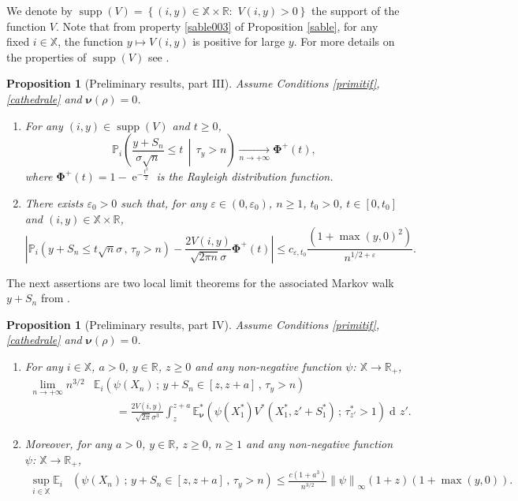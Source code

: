 \documentclass[12pt]{amsart}
\newtheorem{proposition}[theorem]{Proposition}
\theoremstyle{definition}
\numberwithin{equation}{section}
\newcommand*{\abs}[1]{\left\lvert#1\right\rvert}
\newcommand*{\norm}[1]{\left\lVert#1\right\rVert}
\newcommand*{\sachant}[2]{\left.#1 \,\middle|\,#2\right.}
\def\bb#1{\mathbb{#1}}
\def\bs#1{\boldsymbol{#1}}
\def\bf#1{\mathbf{#1}}
\def\geq{\geqslant}
\def\leq{\leqslant}
\newcommand\ee{\varepsilon}
\DeclareMathOperator{\dd}{d\!}
\DeclareMathOperator{\e}{e}
\DeclareMathOperator{\supp}{supp}
\begin{document}
We denote by $\supp(V) = \left\{ (i,y) \in \bb X \times \bb R : \right.$ $\left. V(i,y) > 0 \right\}$ the support of the function $V$. Note that from property \ref{sable003} of Proposition \ref{sable}, for any fixed $i\in \bb X$, the function $y \mapsto V(i,y)$ is positive for large $y$. For more details on the properties of $\supp (V)$ see \cite{grama_limit_2016-1}.

\begin{proposition}[Preliminary results, part III]
\label{racine}
Assume Conditions \ref{primitif}, \ref{cathedrale} and $\bs \nu(\rho) = 0$.
\begin{enumerate}[ref=\arabic*, leftmargin=*, label=\arabic*.]
	\item \label{racine001} For any $(i,y) \in \supp(V)$ and $t\geq 0$,
	\[
	\bb P_i \left( \sachant{\frac{y+S_n}{\sigma \sqrt{n}} \leq t }{\tau_y >n} \right) \underset{n\to+\infty}{\longrightarrow} \mathbf \Phi^+(t),
	\]
	where $\bf \Phi^+(t) = 1-\e^{-\frac{t^2}{2}}$ is the Rayleigh distribution function.
	\item \label{racine002} There exists $\ee_0 >0$ such that, for any $\ee \in (0,\ee_0)$, $n\geq 1$, $t_0 > 0$, $t\in[0,t_0]$ and $(i,y) \in \bb X \times \bb R$,
	\[
	\abs{ \bb P_i \left( y+S_n \leq t \sqrt{n} \sigma \,,\, \tau_y > n \right) - \frac{2V(i,y)}{\sqrt{2\pi n}\sigma} \bf \Phi^+(t) } \leq c_{\ee,t_0} \frac{\left( 1+\max(y,0)^2 \right)}{n^{1/2+\ee}}.
	\]
\end{enumerate}
\end{proposition}

The next assertions are two local limit theorems for the associated Markov walk $y+S_n$ from  \cite{GLLP_CLLT_2017}.

\begin{proposition}[Preliminary results, part IV] 
Assume Conditions \ref{primitif}, \ref{cathedrale} and $\bs \nu(\rho) = 0$.
\label{goliane}
\begin{enumerate}[ref=\arabic*, leftmargin=*, label=\arabic*.]
\item \label{liane} For any $i \in \bb X$, $a>0$, $y \in \bb R$, $z \geq 0$ and any non-negative function $\psi$: $\bb X \to \bb R_+$,
\begin{align*}
	\lim_{n\to +\infty} n^{3/2} &\bb E_i \left( \psi(X_n) \,;\, y+S_n \in [z,z+a] \,,\, \tau_y > n \right) \\
	&\qquad = \frac{2V(i,y)}{\sqrt{2\pi}\sigma^3} \int_z^{z+a} \bb E_{\bs \nu}^* \left( \psi(X_1^*) V^*\left( X_1^*, z'+S_1^* \right) \,;\, \tau_{z'}^* > 1 \right) \dd z'.
\end{align*}
\item \label{gorilleBP} Moreover, for any $a>0$, $y \in \bb R$, $z \geq 0$, $n \geq 1$ and any non-negative function $\psi$: $\bb X \to \bb R_+$,
\begin{align*}
	\sup_{i\in \bb X} \bb E_i &\left( \psi(X_n) \,;\, y+S_{n} \in [z,z+a] \,,\, \tau_y > n \right) \leq \frac{c \left( 1+a^3 \right)}{n^{3/2}} \norm{\psi}_{\infty} \left( 1+z \right)\left( 1+\max(y,0) \right).
\end{align*}
\end{enumerate}
\end{proposition}
\end{document}

